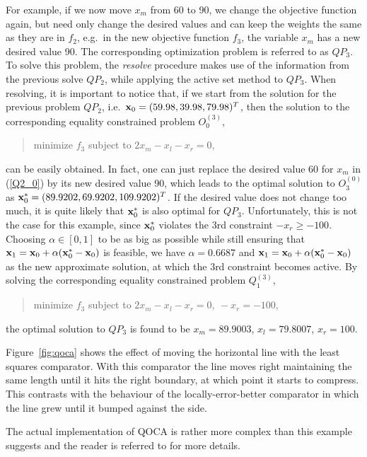 \documentclass{article}
\begin{document}
For example, if we now move $x_m$ from 60 to 90,
we change the objective function again, but need only change the 
desired values and can keep the weights the same as they are in $f_2$,
e.g.\ in the new objective function $f_3$, the variable $x_m$ has 
a new desired value 90. The corresponding optimization problem
is referred to as $QP_3$\@. To solve this problem, the {\em resolve}
procedure makes use of the information from the
previous solve $QP_2$, while applying the active set method to $QP_3$\@. 
When resolving, it is important to notice that, if we start from 
the solution for the previous problem $QP_2$, i.e.\ ${\bf x}_0 = (59.98,
39.98,79.98)^T$, then the solution to the corresponding equality
constrained problem $O^{(3)}_0$,
\begin{quote}
minimize $f_3 $ subject to $2x_m -x_l -x_r = 0$,
\end{quote}
can be easily obtained. In fact, one can just replace the desired
value 60 for $x_m$ in (\ref{Q2_0}) by its new desired value 90, which 
leads to the optimal solution to $O^{(0)}_3$ as 
${\bf x}^\ast_0 = (89.9202, 69.9202,109.9202)^T$\@. If the desired value 
does not change too much, it is quite likely that ${\bf x}^\ast_0$ is also 
optimal for $QP_3$\@. Unfortunately, this is not the case for this example,
since ${\bf x}^\ast_0$ violates the 3rd constraint $-x_r \geq -100$\@.
Choosing $\alpha \in [ 0, 1]$ to be as big as possible while still ensuring
that
${\bf x}_1 = {\bf x}_0 + \alpha({\bf x}^\ast_0 - {\bf x}_0)$ is feasible, 
we have $\alpha = 0.6687$
and ${\bf x}_1 = {\bf x}_0 + \alpha({\bf x}^\ast_0 - {\bf x}_0)$ as the new approximate 
solution, at which the 3rd constraint becomes active. By
solving the corresponding
equality constrained problem $Q^{(3)}_1$,
\begin{quote}
minimize $f_3 $ subject to $2x_m - x_l -x_r = 0, 
\ -x_r = -100 $,
\end{quote}
the optimal solution to $QP_3$ is found to be 
$x_m = 89.9003$, $x_l = 79.8007$,
$x_r = 100$. 

Figure~\ref{fig:qoca} shows the effect of moving the horizontal line
with the least squares comparator. With this comparator the line
moves right maintaining the same length until it hits the right boundary,
at which point it starts to compress. This contrasts with the behaviour
of the locally-error-better comparator
in which the line grew until it bumped against the side.

The actual implementation of QOCA is rather more complex than this example 
suggests and the reader is referred to \cite{fletcher-book} for more details.
\end{document}
